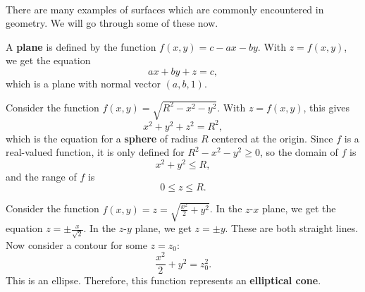 \documentclass[../multivariate_calculus.tex]{subfiles}
\begin{document}
        \paragraph{}
        There are many examples of surfaces which are commonly encountered in geometry.
        We will go through some of these now.
        \begin{example}
            A \textbf{plane} is defined by the function $f(x,y)=c-ax-by$.
            With $z=f(x,y)$, we get the equation
            \begin{equation}
                ax+by+z=c,
            \end{equation}
            which is a plane with normal vector $(a,b,1)$.
        \end{example}
        \begin{example}
            Consider the function $f(x,y)=\sqrt{R^2-x^2-y^2}$. With $z=f(x,y)$, this gives
            \begin{equation}
                x^2+y^2+z^2=R^2,
            \end{equation}
            which is the equation for a \textbf{sphere} of radius $R$ centered at the origin.
            Since $f$ is a real-valued function, it is only defined for $R^2-x^2-y^2\geq0$, so the domain of $f$ is
            \begin{equation}
                x^2+y^2\leq R,
            \end{equation}
            and the range of $f$ is
            \begin{equation}
                0\leq z\leq R.
            \end{equation}
        \end{example}
        \begin{example}
            Consider the function $f(x,y)=z=\sqrt{\frac{x^2}{2}+y^2}$.
            In the $z$-$x$ plane, we get the equation $z=\pm\frac{x}{\sqrt{2}}$.
            In the $z$-$y$ plane, we get $z=\pm y$.
            These are both straight lines.
            Now consider a contour for some $z=z_0$:
            \begin{equation}
                \frac{x^2}{2}+y^2=z_0^2.
            \end{equation}
            This is an ellipse.
            Therefore, this function represents an \textbf{elliptical cone}.
        \end{example}
\end{document}
